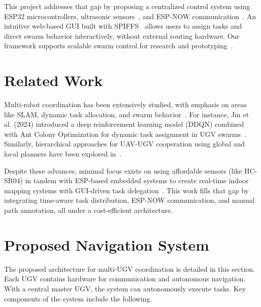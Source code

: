 \documentclass[conference]{IEEEtran}
\begin{document}
\noindent This project addresses that gap by proposing a centralized control system using ESP32 microcontrollers, ultrasonic sensors~\cite{arduino_hcsr04}, and ESP-NOW communication~\cite{espnowguide}. An intuitive web-based GUI built with SPIFFS~\cite{randomnerd2024esp32} allows users to assign tasks and direct swarm behavior interactively, without external routing hardware. Our framework supports scalable swarm control for research and prototyping~\cite{jin2024multi, mdpi2022hierarchical}.
\section{Related Work}
\label{sec:related-work}

Multi-robot coordination has been extensively studied, with emphasis on areas like SLAM, dynamic task allocation, and swarm behavior~\cite{brambilla2013swarm, kalra2005hoplite}. For instance, Jin et al. (2024) introduced a deep reinforcement learning model (DDQN) combined with Ant Colony Optimization for dynamic task assignment in UGV swarms~\cite{jin2024multi}. Similarly, hierarchical approaches for UAV-UGV cooperation using global and local planners have been explored in~\cite{mdpi2022hierarchical}.

Despite these advances, minimal focus exists on using affordable sensors (like HC-SR04) in tandem with ESP-based embedded systems to create real-time indoor mapping systems with GUI-driven task delegation~\cite{arduino_hcsr04, espnowguide, randomnerd2024esp32}. This work fills that gap by integrating time-aware task distribution, ESP-NOW communication, and manual path annotation, all under a cost-efficient architecture.
\section{Proposed Navigation System}
\label{sec:proposed-system}

The proposed architecture for multi-UGV coordination is detailed in this section. Each UGV contains hardware for communication and autonomous navigation. With a central master UGV, the system can autonomously execute tasks. Key components of the system include the following.
\end{document}
